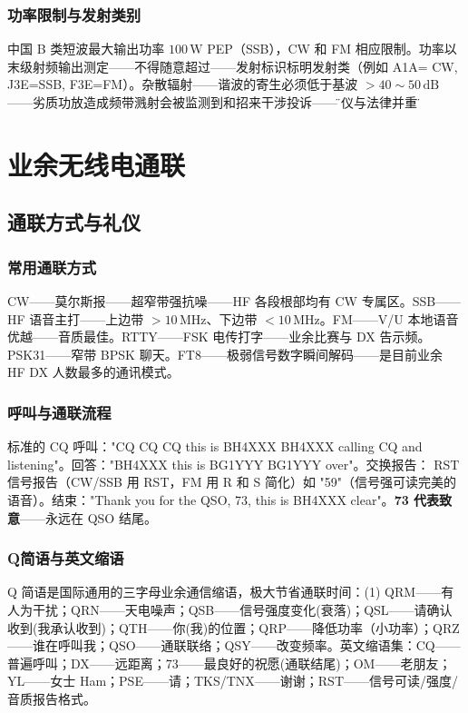 \documentclass[12pt,UTF8]{ctexbook}
\begin{document}
\subsection{功率限制与发射类别}

中国 B 类短波最大输出功率 $100\,\mathrm{W}$ PEP（SSB），CW 和 FM 相应限制。功率以末级射频输出测定——不得随意超过——发射标识标明发射类（例如 A1A= CW, J3E=SSB, F3E=FM）。杂散辐射——谐波的寄生必须低于基波 $>40\sim50\,\mathrm{dB}$——劣质功放造成频带溅射会被监测到和招来干涉投诉——\"礼仪与法律并重\"。


\chapter{业余无线电通联}
\label{chap:ham_qso}

\section{通联方式与礼仪}
\label{sec:ham_modes_etiquette}

\subsection{常用通联方式}
CW——莫尔斯报——超窄带强抗噪——HF 各段根部均有 CW 专属区。SSB——HF 语音主打——上边带 $>10\,\mathrm{MHz}$、下边带 $<10\,\mathrm{MHz}$。FM——V/U 本地语音优越——音质最佳。RTTY——FSK 电传打字——业余比赛与 DX 告示频。PSK31——窄带 BPSK 聊天。FT8——极弱信号数字瞬间解码——是目前业余 HF DX 人数最多的通讯模式。

\subsection{呼叫与通联流程}
标准的 CQ 呼叫："CQ CQ CQ this is BH4XXX BH4XXX calling CQ and listening"。回答："BH4XXX this is BG1YYY BG1YYY over"。交换报告： RST 信号报告（CW/SSB 用 RST，FM 用 R 和 S 简化）如 "59"（信号强可读完美的语音）。结束："Thank you for the QSO, 73, this is BH4XXX clear"。\textbf{73 代表致意}——永远在 QSO 结尾。

\subsection{Q简语与英文缩语}
Q 简语是国际通用的三字母业余通信缩语，极大节省通联时间：(1) QRM——有人为干扰；QRN——天电噪声；QSB——信号强度变化(衰落)；QSL——请确认收到(我承认收到)；QTH——你(我)的位置；QRP——降低功率（小功率）；QRZ——谁在呼叫我；QSO——通联联络；QSY——改变频率。英文缩语集：CQ——普遍呼叫；DX——远距离；73——最良好的祝愿(通联结尾)；OM——老朋友；YL——女士 Ham；PSE——请；TKS/TNX——谢谢；RST——信号可读/强度/音质报告格式。
\end{document}
